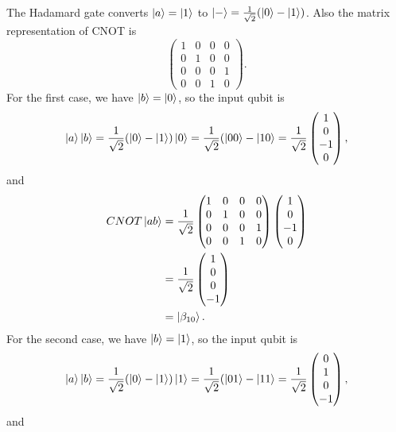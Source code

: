 \documentclass[10pt]{article}
\begin{document}
The Hadamard gate converts $\ket{a} = \ket{1}$ to $\ket{-} = \frac{1}{\sqrt{2}} (\ket{0} - \ket{1})$. Also the matrix representation of CNOT is
\[
\begin{pmatrix}
1 & 0 & 0 & 0 \\
0 & 1 & 0 & 0 \\
0 & 0 & 0 & 1 \\
0 & 0 & 1 & 0
\end{pmatrix}.
\]
For the first case, we have $\ket{b} = \ket{0}$, so the input qubit is 
\[
\ket{a} \ket{b} = \frac{1}{\sqrt{2}} (\ket{0} - \ket{1})\ket{0} = \frac{1}{\sqrt{2}} (\ket{00} - \ket{10} = 
\frac{1}{\sqrt{2}}
\begin{pmatrix}
1 \\
0 \\
-1 \\
0
\end{pmatrix},
\]
and
\begin{align*}
CNOT \ket{ab} &= 
\frac{1}{\sqrt{2}}
\begin{pmatrix}
1 & 0 & 0 & 0 \\
0 & 1 & 0 & 0 \\
0 & 0 & 0 & 1 \\
0 & 0 & 1 & 0
\end{pmatrix}
\begin{pmatrix}
1 \\
0 \\
-1 \\
0
\end{pmatrix} \\
&= \frac{1}{\sqrt{2}}
\begin{pmatrix}
1 \\
0 \\
0 \\
-1
\end{pmatrix} \\
&= \ket{\beta_{10}}.
\end{align*}
For the second case, we have $\ket{b} = \ket{1}$, so the input qubit is 
\[
\ket{a} \ket{b} = \frac{1}{\sqrt{2}} (\ket{0} - \ket{1})\ket{1} = \frac{1}{\sqrt{2}} (\ket{01} - \ket{11} = 
\frac{1}{\sqrt{2}}
\begin{pmatrix}
0 \\
1 \\
0 \\
-1
\end{pmatrix},
\]
and
\end{document}
